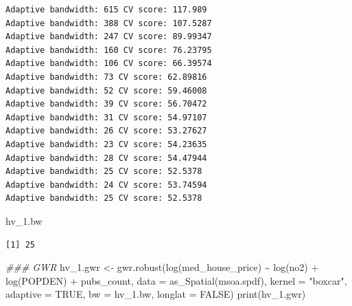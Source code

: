 \documentclass[
  letterpaper,
]{scrbook}
\newenvironment{Shaded}{\begin{snugshade}}{\end{snugshade}}
\newcommand{\AttributeTok}[1]{\textcolor[rgb]{0.40,0.45,0.13}{#1}}
\newcommand{\ConstantTok}[1]{\textcolor[rgb]{0.56,0.35,0.01}{#1}}
\newcommand{\DocumentationTok}[1]{\textcolor[rgb]{0.37,0.37,0.37}{\textit{#1}}}
\newcommand{\FunctionTok}[1]{\textcolor[rgb]{0.28,0.35,0.67}{#1}}
\newcommand{\NormalTok}[1]{\textcolor[rgb]{0.00,0.23,0.31}{#1}}
\newcommand{\OtherTok}[1]{\textcolor[rgb]{0.00,0.23,0.31}{#1}}
\newcommand{\SpecialCharTok}[1]{\textcolor[rgb]{0.37,0.37,0.37}{#1}}
\newcommand{\StringTok}[1]{\textcolor[rgb]{0.13,0.47,0.30}{#1}}
\begin{document}
\begin{verbatim}
Adaptive bandwidth: 615 CV score: 117.989 
Adaptive bandwidth: 388 CV score: 107.5287 
Adaptive bandwidth: 247 CV score: 89.99347 
Adaptive bandwidth: 160 CV score: 76.23795 
Adaptive bandwidth: 106 CV score: 66.39574 
Adaptive bandwidth: 73 CV score: 62.89816 
Adaptive bandwidth: 52 CV score: 59.46008 
Adaptive bandwidth: 39 CV score: 56.70472 
Adaptive bandwidth: 31 CV score: 54.97107 
Adaptive bandwidth: 26 CV score: 53.27627 
Adaptive bandwidth: 23 CV score: 54.23635 
Adaptive bandwidth: 28 CV score: 54.47944 
Adaptive bandwidth: 25 CV score: 52.5378 
Adaptive bandwidth: 24 CV score: 53.74594 
Adaptive bandwidth: 25 CV score: 52.5378 
\end{verbatim}

\begin{Shaded}
\begin{Highlighting}[]
\NormalTok{hv\_1.bw}
\end{Highlighting}
\end{Shaded}

\begin{verbatim}
[1] 25
\end{verbatim}

\begin{Shaded}
\begin{Highlighting}[]
\DocumentationTok{\#\#\# GWR }
\NormalTok{hv\_1.gwr }\OtherTok{\textless{}{-}} \FunctionTok{gwr.robust}\NormalTok{(}\FunctionTok{log}\NormalTok{(med\_house\_price) }\SpecialCharTok{\textasciitilde{}} \FunctionTok{log}\NormalTok{(no2) }\SpecialCharTok{+} \FunctionTok{log}\NormalTok{(POPDEN) }\SpecialCharTok{+}\NormalTok{ pubs\_count,}
                      \AttributeTok{data =} \FunctionTok{as\_Spatial}\NormalTok{(msoa.spdf), }
                      \AttributeTok{kernel =} \StringTok{"boxcar"}\NormalTok{, }
                      \AttributeTok{adaptive =} \ConstantTok{TRUE}\NormalTok{, }
                      \AttributeTok{bw =}\NormalTok{ hv\_1.bw, }
                      \AttributeTok{longlat =} \ConstantTok{FALSE}\NormalTok{)}
\FunctionTok{print}\NormalTok{(hv\_1.gwr)}
\end{Highlighting}
\end{Shaded}
\end{document}
